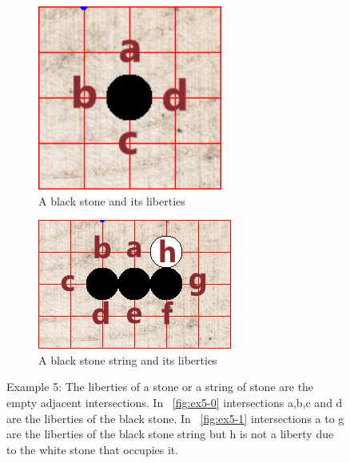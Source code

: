 \documentclass{l4proj}
\begin{document}
\begin{figure}[!h]
\centering
\begin{subfigure}[b]{0.45\textwidth}
\centering
\includegraphics[width=0.666\textwidth]{ex/Ex5-0.png}
\caption{A black stone and its liberties}
\label{fig:ex5-0}
\end{subfigure}
\begin{subfigure}[b]{0.45\textwidth}
\centering
\includegraphics[width=\textwidth]{ex/Ex5-1.png}
\caption{A black stone string and its liberties}
\label{fig:ex5-1}
\end{subfigure}
\caption{Example 5: The liberties of a stone or a string of stone are the empty adjacent intersections.  In ~\autoref{fig:ex5-0} intersections a,b,c and d are the liberties of the black stone.
In ~\autoref{fig:ex5-1} intersections a to g are the liberties of the black stone string but h is not a liberty due to the white stone that occupies it.}
\label{fig:ex5}
\end{figure}
\end{document}
